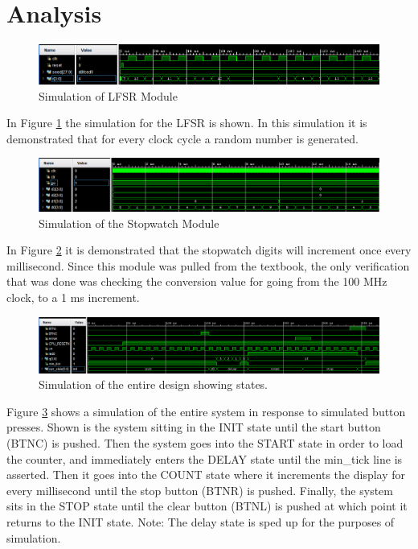 \documentclass[11pt]{article}
\begin{document}
\section{Analysis}
\begin{figure}[H]
	\includegraphics [width=7in]{./figures/lfsr_sim.png}
	\centering
	\caption{Simulation of LFSR Module}
	\label{fig:lfsr_sim}
\end{figure}

In Figure \ref{fig:lfsr_sim} the simulation for the LFSR is shown. In this simulation it is demonstrated that for every clock cycle a random number is generated.

\begin{figure}[H]
	\includegraphics [width=7in]{./figures/stopwatch_sim.png}
	\centering
	\caption{Simulation of the Stopwatch Module}
	\label{fig:stopwatch_sim}
\end{figure}

In Figure \ref{fig:stopwatch_sim} it is demonstrated that the stopwatch digits will increment once every millisecond. Since this module was pulled from the textbook, the only verification that was done was checking the conversion value for going from the 100 MHz clock, to a 1 ms increment.

\begin{figure}[H]
	\includegraphics [width=7in]{./figures/system_sim.png}
	\centering
	\caption{Simulation of the entire design showing states.}
	\label{fig:system_sim}
\end{figure}

Figure \ref{fig:system_sim} shows a simulation of the entire system in response to simulated button presses. Shown is the system sitting in the INIT state until the start button (BTNC) is pushed. Then the system goes into the START state in order to load the counter, and immediately enters the DELAY state until the min\_tick line is asserted. Then it goes into the COUNT state where it increments the display for every millisecond until the stop button (BTNR) is pushed. Finally, the system sits in the STOP state until the clear button (BTNL) is pushed at which point it returns to the INIT state. Note: The delay state is sped up for the purposes of simulation.
 
\end{document}
